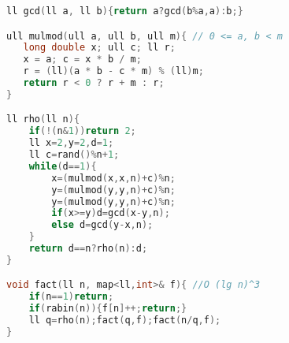 \begin{lstlisting}[language=C++]
ll gcd(ll a, ll b){return a?gcd(b%a,a):b;}

ull mulmod(ull a, ull b, ull m){ // 0 <= a, b < m
   long double x; ull c; ll r;
   x = a; c = x * b / m;
   r = (ll)(a * b - c * m) % (ll)m;
   return r < 0 ? r + m : r;
}

ll rho(ll n){
    if(!(n&1))return 2;
    ll x=2,y=2,d=1;
    ll c=rand()%n+1;
    while(d==1){
        x=(mulmod(x,x,n)+c)%n;
        y=(mulmod(y,y,n)+c)%n;
        y=(mulmod(y,y,n)+c)%n;
        if(x>=y)d=gcd(x-y,n);
        else d=gcd(y-x,n);
    }
    return d==n?rho(n):d;
}

void fact(ll n, map<ll,int>& f){ //O (lg n)^3
	if(n==1)return;
	if(rabin(n)){f[n]++;return;}
	ll q=rho(n);fact(q,f);fact(n/q,f);
}
\end{lstlisting}